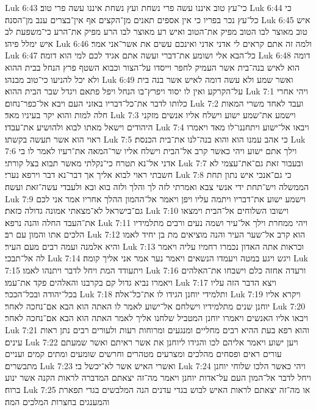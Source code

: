 Luk 6:43  כי־עץ טוב איננו עשה פרי נשחת ועץ נשחת איננו עשה פרי טוב׃
Luk 6:44  כי כל־עץ נכר בפריו כי אין אספים תאנים מן־הקצים אף אין־בצרים ענב מן־הסנה׃
Luk 6:45  איש טוב מאוצר לבו הטוב מפיק את־הטוב ואיש רע מאוצר לבו הרע מפיק את־הרע כי־משפעת לב איש ימלל פיהו׃
Luk 6:46  ולמה זה אתם קראים לי אדני אדני ואינכם עשים את אשר־אני אמר׃
Luk 6:47  כל־הבא אלי ושומע את־דברי ועשה אתם אגיד לכם למי הוא דומה׃
Luk 6:48  דומה הוא לאיש בנה־בית אשר העמיק לחפר וייסדו על־הצור וכבוא השטף פרץ הנחל בבית ההוא ולא יכל להניעו כי־טוב מבנהו׃
Luk 6:49  ואשר שמע ולא עשה דומה לאיש אשר בנה בית על־הקרקע ואין לו יסוד ויפרץ־בו הנחל ויפל פתאם ויגדל שבר הבית ההוא׃
Luk 7:1  ויהי אחרי כלותו לדבר את־כל־דבריו באזני העם ויבא אל־כפר־נחום׃
Luk 7:2  ועבד לאחד משרי המאות חלה למות והוא יקר בעיניו מאד׃
Luk 7:3  וישמע את־שמע ישוע וישלח אליו אנשים מזקני היהודים וישאל מאתו לבוא ולהושיע את־עבדו׃
Luk 7:4  ויבאו אל־ישוע ויתחננו־לו מאד ויאמרו ראוי הוא אשר תעשה בקשתו׃
Luk 7:5  כי אהב עמנו הוא והוא בנה־לנו את־בית הכנסת׃
Luk 7:6  וילך אתם ישוע ויהי כאשר קרב אל־הבית וישלח אליו שר־המאה את־רעיו לאמר לו בי אדני אל־נא תטרח כי־נקלתי מאשר תבוא בצל קורתי׃
Luk 7:7  ובעבור זאת גם־את־עצמי לא חשבתי ראוי לבוא אליך אך דבר־נא דבר וירפא נערי׃
Luk 7:8  כי גם־אנכי איש נתון תחת הממשלה ויש־תחת ידי אנשי צבא ואמרתי לזה לך והלך ולזה בוא ובא ולעבדי עשה־זאת ועשה׃
Luk 7:9  וישמע ישוע את־דבריו ויתמה עליו ויפן ויאמר אל־ההמון ההלך אחריו אמר אני לכם גם־בישראל לא־מצאתי אמונה גדולה כזאת׃
Luk 7:10  וישובו השלוחים אל־הבית וימצאו את־העבד החלה והנה נרפא׃
Luk 7:11  ויהי ממחרת וילך אל־עיר ושמה נעים ורבים מתלמידיו הלכים אתו והמון עם רב׃
Luk 7:12  הוא קרב אל־שער העיר והנה מוציאים מת בן יחיד לאמו והיא אלמנה ועמה רבים מעם העיר׃
Luk 7:13  וכראות אתה האדון נכמרו רחמיו עליה ויאמר לה אל־תבכי׃
Luk 7:14  ויגש ויגע במטה ויעמדו הנשאים ויאמר נער אמר אני אליך קומה׃
Luk 7:15  ויתעודד המת ויחל לדבר ויתנהו לאמו׃
Luk 7:16  ורעדה אחזה כלם וישבחו את־האלהים ויאמרו נביא גדול קם בקרבנו והאלהים פקד את־עמו׃
Luk 7:17  ויצא הדבר הזה עליו בכל־יהודה ובכל־הככר׃
Luk 7:18  ותלמידי יוחנן הגידו לו את־כל־אלה׃
Luk 7:19  ויקרא אליו יוחנן שנים מתלמידיו וישלחם אל־ישוע לאמר לו האתה הוא הבא אם־נחכה לאחר׃
Luk 7:20  ויבאו אליו האנשים ויאמרו יוחנן המטביל שלחנו אליך לאמר האתה הוא הבא אם־נחכה לאחר׃
Luk 7:21  והוא רפא בעת ההיא רבים מחליים ומנגעים ומרוחות רעות ולעורים רבים נתן ראות עינים׃
Luk 7:22  ויען ישוע ויאמר אליהם לכו והגידו ליוחנן את אשר ראיתם ואשר שמעתם עורים ראים ופסחים מהלכים ומצרעים מטהרים וחרשים שומעים ומתים קמים ועניים מתבשרים׃
Luk 7:23  ואשרי האיש אשר לא־יכשל בי׃
Luk 7:24  ויהי כאשר הלכו שלוחי יוחנן ויחל לדבר אל־המון העם על־אדות יוחנן ויאמר מה־זה יצאתם המדברה לראות הקנה אשר ינוע ברוח׃
Luk 7:25  או מה־זה יצאתם לראות האיש לבוש בגדי עדנים הנה המלבשים בגדי תפארת והמענגים בחצרות המלכים המה׃
